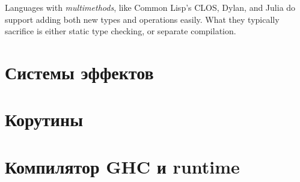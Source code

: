 \documentclass[12pt]{article}
\begin{document}









    Languages with \textit{multimethods}, like Common Lisp’s CLOS, Dylan, and Julia do support adding both new types and operations easily.
    What they typically sacrifice is either static type checking, or separate compilation.





    \section{Системы эффектов} \label{sec:effect-systems}



    \section{Корутины}




    \section{Компилятор GHC и runtime}


\end{document}
